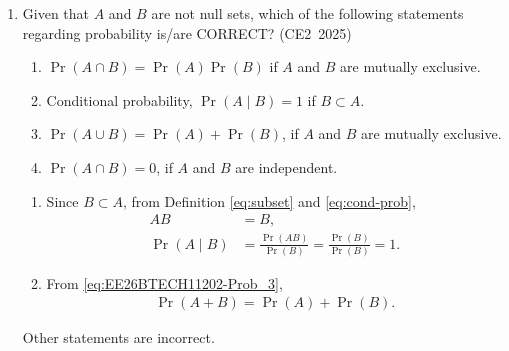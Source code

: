 \begin{enumerate}[label=\thesubsection.\arabic*, ref=\thesubsection.\theenumi,itemsep=0pt]
\begin{enumerate}
    \item $z$-component of Curl of velocity:
          $\nabla\times\vec{V}
          =\brak{\frac{\partial v}{\partial x}
          -\frac{\partial u}{\partial y}}\vec{z}$
    \item $z$-component of Curl of velocity:
          $\nabla\times\vec{V}
          =\brak{\frac{\partial u}{\partial x}
          -\frac{\partial v}{\partial y}}\vec{z}$
    \item Divergence of velocity:
          $\nabla\cdot\vec{V}
          =\frac{\partial u}{\partial x}
          +\frac{\partial v}{\partial y}$
    \item Divergence of velocity:
          $\nabla\cdot\vec{V}
          =\frac{\partial u}{\partial y}
          +\frac{\partial v}{\partial x}$
\end{enumerate}
%
\solution
See
	\eqref{eq:curl}
	and
	\eqref{eq:div}.
%
\item
Given that $A$ and $B$ are not null sets, which of the following
statements regarding probability is/are CORRECT?
\hfill (CE2~2025)
%
\begin{enumerate}
    \item $\Pr(A\cap B)=\Pr(A)\Pr(B)$ if $A$ and $B$ are mutually exclusive.
    \item Conditional probability, $\Pr(A\mid B)=1$ if $B\subset A$.
    \item $\Pr(A\cup B)=\Pr(A)+\Pr(B)$, if $A$ and $B$ are mutually exclusive.
    \item $\Pr(A\cap B)=0$, if $A$ and $B$ are independent.
\end{enumerate}
%
\solution
\begin{enumerate}
	\item Since $B\subset A$, from 
		Definition
	\eqref{eq:subset}
and
	\eqref{eq:cond-prob},
\begin{align}
    AB &= B, \\
    \Pr(A\mid B)
    &=\frac{\Pr(A B)}{\Pr(B)}
     =\frac{\Pr(B)}{\Pr(B)}=1.
\end{align}
%
\item 
	From \eqref{eq:EE26BTECH11202-Prob_3},
\begin{align}
    \Pr(A+B)=\Pr(A)+\Pr(B).
\end{align}
\end{enumerate}
Other statements are incorrect.


\end{enumerate}
